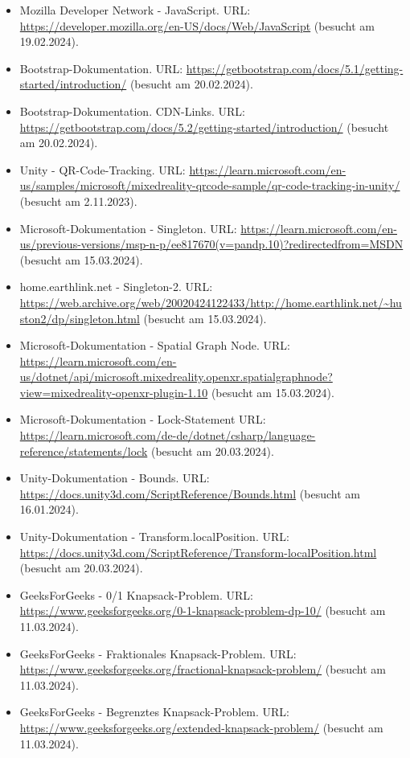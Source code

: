 \begin{itemize}
    \item Mozilla Developer Network - JavaScript. URL: \url{https://developer.mozilla.org/en-US/docs/Web/JavaScript} (besucht am 19.02.2024).
    \item Bootstrap-Dokumentation. URL: \url{https://getbootstrap.com/docs/5.1/getting-started/introduction/} (besucht am 20.02.2024).
    \item Bootstrap-Dokumentation. CDN-Links. URL: \url{https://getbootstrap.com/docs/5.2/getting-started/introduction/} (besucht am 20.02.2024).
    \item Unity - QR-Code-Tracking. URL: \url{https://learn.microsoft.com/en-us/samples/microsoft/mixedreality-qrcode-sample/qr-code-tracking-in-unity/} (besucht am 2.11.2023).
    \item Microsoft-Dokumentation - Singleton. URL: \url{https://learn.microsoft.com/en-us/previous-versions/msp-n-p/ee817670(v=pandp.10)?redirectedfrom=MSDN} (besucht am 15.03.2024).
    \item home.earthlink.net - Singleton-2. URL: \url{https://web.archive.org/web/20020424122433/http://home.earthlink.net/~huston2/dp/singleton.html} (besucht am 15.03.2024).
    \item Microsoft-Dokumentation - Spatial Graph Node. URL: \url{https://learn.microsoft.com/en-us/dotnet/api/microsoft.mixedreality.openxr.spatialgraphnode?view=mixedreality-openxr-plugin-1.10} (besucht am 15.03.2024).
    \item Microsoft-Dokumentation - Lock-Statement URL: \url{https://learn.microsoft.com/de-de/dotnet/csharp/language-reference/statements/lock} (besucht am 20.03.2024).
    \item Unity-Dokumentation - Bounds. URL: \url{https://docs.unity3d.com/ScriptReference/Bounds.html} (besucht am 16.01.2024).
    \item Unity-Dokumentation - Transform.localPosition. URL: \url{https://docs.unity3d.com/ScriptReference/Transform-localPosition.html} (besucht am 20.03.2024).
    \item GeeksForGeeks - 0/1 Knapsack-Problem. URL: \url{https://www.geeksforgeeks.org/0-1-knapsack-problem-dp-10/} (besucht am 11.03.2024).
    \item GeeksForGeeks - Fraktionales Knapsack-Problem. URL: \url{https://www.geeksforgeeks.org/fractional-knapsack-problem/} (besucht am 11.03.2024).
    \item GeeksForGeeks - Begrenztes Knapsack-Problem. URL: \url{https://www.geeksforgeeks.org/extended-knapsack-problem/} (besucht am 11.03.2024).

\end{itemize}
